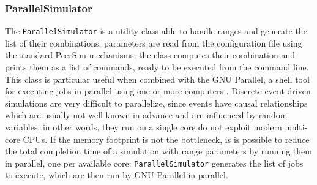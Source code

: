 \subsubsection{ParallelSimulator}
The \texttt{ParallelSimulator} is a utility class able to handle ranges and generate the list of their combinations:
parameters are read from the configuration file using the standard PeerSim mechanisms;
the class computes their combination and prints them as a list of commands, ready to be executed from the command line.
This class is particular useful when combined with the GNU Parallel, a shell tool for executing jobs in parallel using one or more computers \cite{gnu_parallel}.
Discrete event driven simulations are very difficult to parallelize, since events have causal relationships which are usually not well known in advance and are influenced by random variables:
in other words, they run on a single core do not exploit modern multi-core \ac{CPU}s.
If the memory footprint is not the bottleneck, is is possible to reduce the total completion time of a simulation with range parameters by running them in parallel, one per available core:
\texttt{ParallelSimulator} generates the list of jobs to execute, which are then run by GNU Parallel in parallel.

